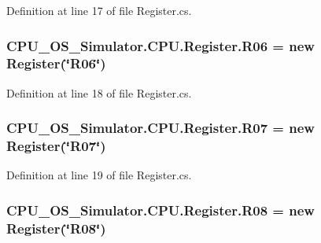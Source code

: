 Definition at line 17 of file Register.\+cs.

\hypertarget{class_c_p_u___o_s___simulator_1_1_c_p_u_1_1_register_a643141b987101b5bc93f99d04faecca8}{}
\subsubsection[{R06}]{ C\+P\+U\+\_\+\+O\+S\+\_\+\+Simulator.\+C\+P\+U.\+Register.\+R06 = new {\bf Register}(\char`\"{}R06\char`\"{})\hspace{0.3cm}{\ttfamily [static]}}\label{class_c_p_u___o_s___simulator_1_1_c_p_u_1_1_register_a643141b987101b5bc93f99d04faecca8}


Definition at line 18 of file Register.\+cs.

\hypertarget{class_c_p_u___o_s___simulator_1_1_c_p_u_1_1_register_a2224ffa8d2250d999afcddf739b5762b}{}
\subsubsection[{R07}]{ C\+P\+U\+\_\+\+O\+S\+\_\+\+Simulator.\+C\+P\+U.\+Register.\+R07 = new {\bf Register}(\char`\"{}R07\char`\"{})\hspace{0.3cm}{\ttfamily [static]}}\label{class_c_p_u___o_s___simulator_1_1_c_p_u_1_1_register_a2224ffa8d2250d999afcddf739b5762b}


Definition at line 19 of file Register.\+cs.

\hypertarget{class_c_p_u___o_s___simulator_1_1_c_p_u_1_1_register_a782cd395e24947e6bb509cbf61d090e2}{}
\subsubsection[{R08}]{ C\+P\+U\+\_\+\+O\+S\+\_\+\+Simulator.\+C\+P\+U.\+Register.\+R08 = new {\bf Register}(\char`\"{}R08\char`\"{})\hspace{0.3cm}{\ttfamily [static]}}\label{class_c_p_u___o_s___simulator_1_1_c_p_u_1_1_register_a782cd395e24947e6bb509cbf61d090e2}


